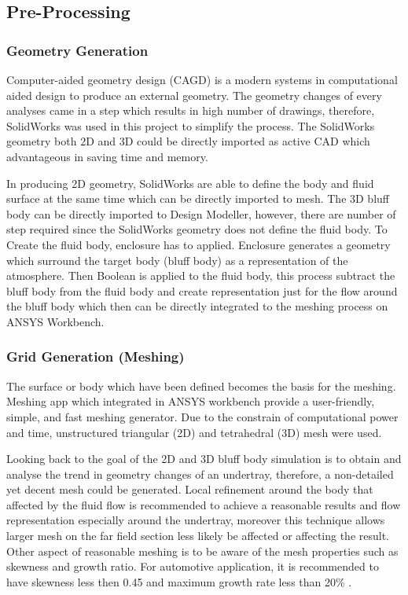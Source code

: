 \subsection{Pre-Processing}
\subsubsection{Geometry Generation}
Computer-aided geometry design (CAGD) is a modern systems in computational aided design to produce an external geometry\cite{Cummings2015AppliedAerodynamics}. The geometry changes of every analyses came in a step which results in high number of drawings, therefore, SolidWorks was used in this project to simplify the process. The SolidWorks geometry both 2D and 3D could be directly imported as active CAD which advantageous in saving time and memory.

\noindent In producing 2D geometry, SolidWorks are able to define the body and fluid surface at the same time which can be directly imported to mesh. The 3D bluff body can be directly imported to Design Modeller, however, there are number of step required since the SolidWorks geometry does not define the fluid body. To Create the fluid body, enclosure has to applied. Enclosure generates a geometry which surround the target body (bluff body) as a representation of the atmosphere. Then Boolean is applied to the fluid body, this process subtract the bluff body from the fluid body and create representation just for the flow around the bluff body which then  can be directly integrated to the meshing process on ANSYS Workbench.

\subsubsection{Grid Generation (Meshing)}
The surface or body which have been defined becomes the basis for the meshing. Meshing app which integrated in ANSYS workbench provide a user-friendly, simple, and fast meshing generator. Due to the constrain of computational power and time, unstructured triangular (2D) and tetrahedral (3D) mesh were used. 

\noindent Looking back to the goal of the 2D and 3D bluff body simulation is to obtain and analyse the trend in geometry changes of an undertray, therefore, a non-detailed yet decent mesh could be generated. Local refinement around the body that affected by the fluid flow is recommended \cite{Lanfrit2005BestFLUENT} to achieve a reasonable results and flow representation especially around the undertray, moreover this technique allows larger mesh on the far field section less likely be affected or affecting the result. Other aspect of reasonable meshing is to be aware of the mesh properties such as skewness and growth ratio. For automotive application, it is recommended to have skewness less then 0.45 and maximum growth rate less than 20\% \cite{Lanfrit2005BestFLUENT}. 


